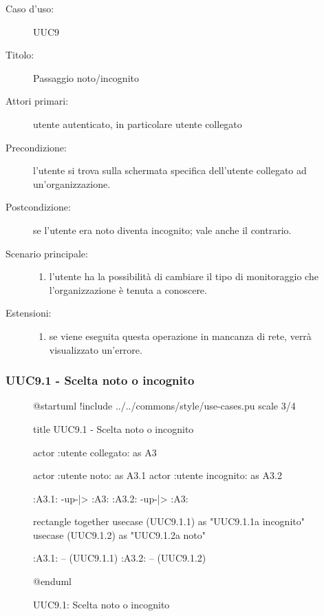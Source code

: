 \documentclass[casi-duso]{subfiles}
\begin{document}
\begin{description}
  \item[Caso d’uso:] UUC9
  \item[Titolo:] Passaggio noto/incognito
  \item[Attori primari:] utente autenticato, in particolare utente collegato
  \item[Precondizione:] l'utente si trova sulla schermata specifica dell'utente collegato ad un'organizzazione.
  \item[Postcondizione:] se l'utente era noto diventa incognito; vale anche il contrario.
  \item[Scenario principale:]
        \begin{enumerate}
          \item l'utente ha la possibilità di cambiare il tipo di monitoraggio che l'organizzazione è tenuta a conoscere.
        \end{enumerate}
  \item[Estensioni:]
        \begin{enumerate}
          \item se viene eseguita questa operazione in mancanza di rete, verrà visualizzato un'errore.
        \end{enumerate}
\end{description}

\subsubsection{UUC9.1 - Scelta noto o incognito}%
\label{subsub:UUC9.1utente}

\begin{figure}[h!] 
  \centering 
  \begin{plantuml}
  @startuml
  !include ../../commons/style/use-cases.pu
  scale 3/4

  title UUC9.1 - Scelta noto o incognito

  actor :utente collegato: as A3

  actor :utente noto: as A3.1
  actor :utente incognito: as A3.2

  :A3.1: -up-|> :A3:
  :A3.2: -up-|> :A3:

  rectangle {
    together {
      usecase (UUC9.1.1) as "UUC9.1.1\nPassaggio a incognito"
      usecase (UUC9.1.2) as "UUC9.1.2\nPassaggio a noto"
    }
  }

  :A3.1: -- (UUC9.1.1)
  :A3.2: -- (UUC9.1.2)

  @enduml
  \end{plantuml} 
  \caption{UUC9.1: Scelta noto o incognito} 
  \label{fig:uuc9_1} 
\end{figure}
\end{document}
